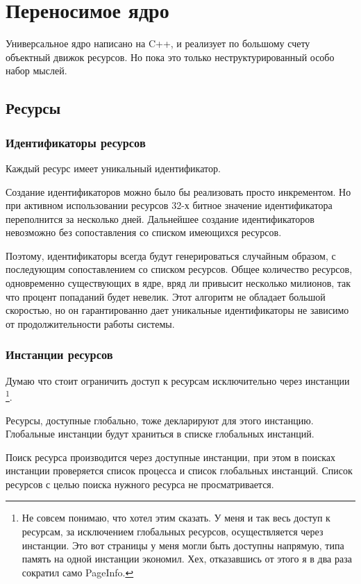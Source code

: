 \section{Переносимое ядро}

Универсальное ядро написано на C++, и реализует по большому счету объектный
движок ресурсов. Но пока это только неструктурированный особо набор мыслей.

\subsection{Ресурсы}

\subsubsection{Идентификаторы ресурсов}

Каждый ресурс имеет уникальный идентификатор.

Создание идентификаторов можно было бы реализовать просто инкрементом. Но при
активном использовании ресурсов 32-х битное значение идентификатора переполнится
за несколько дней. Дальнейшее создание идентификаторов невозможно без
сопоставления со списком имеющихся ресурсов.

Поэтому, идентификаторы всегда будут генерироваться случайным образом, с
последующим сопоставлением со списком ресурсов. Общее количество ресурсов,
одновременно существующих в ядре, вряд ли привысит несколько милионов, так что
процент попаданий будет невелик. Этот алгоритм не обладает большой скоростью, но
он гарантированно дает уникальные идентификаторы не зависимо от
продолжительности работы системы.

\subsubsection{Инстанции ресурсов}

Думаю что стоит ограничить доступ к ресурсам исключительно через инстанции
\footnote{Не совсем понимаю, что хотел этим сказать. У меня и так весь доступ к
ресурсам, за исключением глобальных ресурсов, осуществляется через инстанции.
Это вот страницы у меня могли быть доступны напрямую, типа память на одной
инстанции экономил. Хех, отказавшись от этого я в два раза сократил само
PageInfo.}.

Ресурсы, доступные глобально, тоже декларируют для этого инстанцию. Глобальные
инстанции будут храниться в списке глобальных инстанций.

Поиск ресурса производится через доступные инстанции, при этом в поисках
инстанции проверяется список процесса и список глобальных инстанций. Список
ресурсов с целью поиска нужного ресурса не просматривается.

